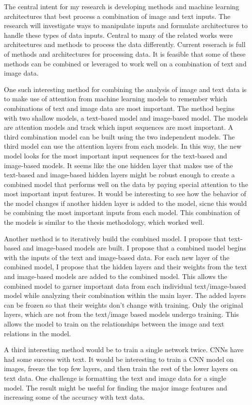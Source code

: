 The central intent for my research is developing methods and machine learning architectures that best process a combination of image and text inputs. The research will investigate ways to manipulate inputs and formulate architectures to handle these types of data inputs.  Central to many of the related works were architectures and methods to process the data differently.  Current reserach is full of methods and architectures for processing data. It is feasible that some of these methods can be combined or leveraged to work well on a combination of text and image data.

One such interesting method for combining the analysis of image and text data is to make use of attention from machine learning models to remember which combinations of text and image data are most important.  The method begins with two shallow models, a text-based model and image-based model.  The models are attention models and track which input sequences are most important.  A third combination model can be built using the two independent models.  The third model can use the attention layers from each models.  In this way, the new model looks for the most important input sequences for the text-based and image-based models. It seems like the one hidden layer that makes use of the text-based and image-based hidden layers might be robust enough to create a combined model that performs well on the data by paying special attention to the most important input features.  It would be interesting to see how the behavior of the model changes if another hidden layer is added to the model, sicne this would be combining the most important inputs from each model.  This combination of the models is similar to the thesis methodology, which worked well.

Another method is to iteratively build the combined model.  I propose that text-based and image-based models are built.  I propose that a combined model begins with the inputs of the text and image-based data. For each new layer of the combined model, I propose that the hidden layers and their weights from the text and image-based models are added to the combined model. This allows the combined model to garner important data from each individual text/image-based model while analyzing their combination within the main layer.  The added layers can be frozen so that their weights don't change with training.  Only the original layers, which are not from the text/image based models undergo training.  This allows the model to train on the relationships between the image and text relations in the model.

A third interesting method would be to train a single network twice. CNNs have had some success with text.  It would be interesting to train a CNN model on images, freeze the top few layers, and then train the rest of the lower layers on text data.  One challenge is formatting the text and image data for a single model.  The result might be useful for finding the major image features and increasing some of the accuracy with text data. 
